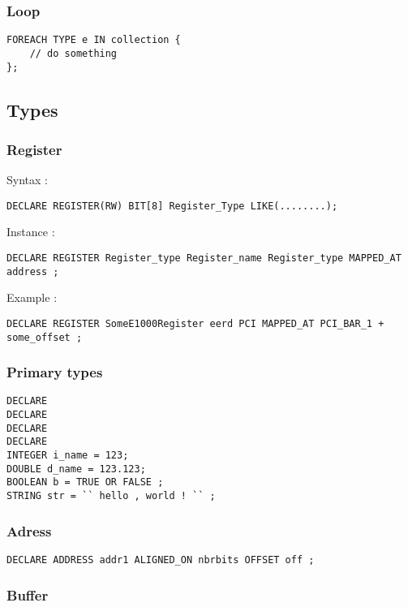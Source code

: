 \documentclass[american]{rtxreport}
\begin{document}
\subsubsection{Loop}
\begin{lstlisting}
FOREACH TYPE e IN collection {
	// do something
};
\end{lstlisting}


\subsection{Types}

\subsubsection{Register}
Syntax :
\begin{lstlisting}
DECLARE REGISTER(RW) BIT[8] Register_Type LIKE(........);
\end{lstlisting}

Instance :
\begin{lstlisting}
DECLARE REGISTER Register_type Register_name Register_type MAPPED_AT
address ;
\end{lstlisting}

Example :
\begin{lstlisting}
DECLARE REGISTER SomeE1000Register eerd PCI MAPPED_AT PCI_BAR_1 +
some_offset ;
\end{lstlisting}


\subsubsection{Primary types}

\begin{lstlisting}
DECLARE
DECLARE
DECLARE
DECLARE
INTEGER i_name = 123;
DOUBLE d_name = 123.123;
BOOLEAN b = TRUE OR FALSE ;
STRING str = `` hello , world ! `` ;
\end{lstlisting}

\subsubsection{Adress}
\begin{lstlisting}
DECLARE ADDRESS addr1 ALIGNED_ON nbrbits OFFSET off ;
\end{lstlisting}

\subsubsection{Buffer}
\end{document}
